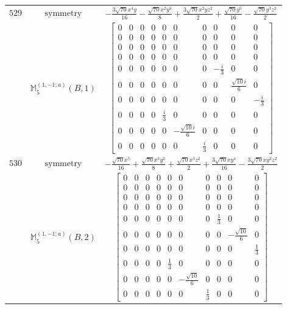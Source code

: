\documentclass[fleqn,8pt,landscape]{jsarticle}
\begin{document}
\begin{longtable}{ccc}
$ 529 $ & $ \text{symmetry} $ & $ - \frac{3 \sqrt{70} x^{4} y}{16} - \frac{\sqrt{70} x^{2} y^{3}}{8} + \frac{3 \sqrt{70} x^{2} y z^{2}}{2} + \frac{\sqrt{70} y^{5}}{16} - \frac{\sqrt{70} y^{3} z^{2}}{2} $ \\
$  $ & $ \mathbb{M}_{5}^{(1,-1;a)}(B,1) $ & $ \begin{bmatrix} 0 & 0 & 0 & 0 & 0 & 0 & 0 & 0 & 0 & 0 \\ 0 & 0 & 0 & 0 & 0 & 0 & 0 & 0 & 0 & 0 \\ 0 & 0 & 0 & 0 & 0 & 0 & 0 & 0 & 0 & 0 \\ 0 & 0 & 0 & 0 & 0 & 0 & 0 & 0 & 0 & 0 \\ 0 & 0 & 0 & 0 & 0 & 0 & 0 & - \frac{i}{3} & 0 & 0 \\ 0 & 0 & 0 & 0 & 0 & 0 & 0 & 0 & \frac{\sqrt{10} i}{6} & 0 \\ 0 & 0 & 0 & 0 & 0 & 0 & 0 & 0 & 0 & - \frac{i}{3} \\ 0 & 0 & 0 & 0 & \frac{i}{3} & 0 & 0 & 0 & 0 & 0 \\ 0 & 0 & 0 & 0 & 0 & - \frac{\sqrt{10} i}{6} & 0 & 0 & 0 & 0 \\ 0 & 0 & 0 & 0 & 0 & 0 & \frac{i}{3} & 0 & 0 & 0 \end{bmatrix} $ \\ \hline
$ 530 $ & $ \text{symmetry} $ & $ - \frac{\sqrt{70} x^{5}}{16} + \frac{\sqrt{70} x^{3} y^{2}}{8} + \frac{\sqrt{70} x^{3} z^{2}}{2} + \frac{3 \sqrt{70} x y^{4}}{16} - \frac{3 \sqrt{70} x y^{2} z^{2}}{2} $ \\
$  $ & $ \mathbb{M}_{5}^{(1,-1;a)}(B,2) $ & $ \begin{bmatrix} 0 & 0 & 0 & 0 & 0 & 0 & 0 & 0 & 0 & 0 \\ 0 & 0 & 0 & 0 & 0 & 0 & 0 & 0 & 0 & 0 \\ 0 & 0 & 0 & 0 & 0 & 0 & 0 & 0 & 0 & 0 \\ 0 & 0 & 0 & 0 & 0 & 0 & 0 & 0 & 0 & 0 \\ 0 & 0 & 0 & 0 & 0 & 0 & 0 & \frac{1}{3} & 0 & 0 \\ 0 & 0 & 0 & 0 & 0 & 0 & 0 & 0 & - \frac{\sqrt{10}}{6} & 0 \\ 0 & 0 & 0 & 0 & 0 & 0 & 0 & 0 & 0 & \frac{1}{3} \\ 0 & 0 & 0 & 0 & \frac{1}{3} & 0 & 0 & 0 & 0 & 0 \\ 0 & 0 & 0 & 0 & 0 & - \frac{\sqrt{10}}{6} & 0 & 0 & 0 & 0 \\ 0 & 0 & 0 & 0 & 0 & 0 & \frac{1}{3} & 0 & 0 & 0 \end{bmatrix} $ \\ \hline

\end{longtable}
\end{document}
